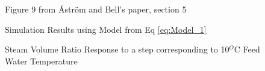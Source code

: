         \begin{figure}[ht]
            \begin{center}
                
                Figure 9 from \r{A}str\"{o}m and Bell's paper, section 5 \cite{Astrom}
                
                
                Simulation Results using Model from Eq \eqref{eq:Model_1}
                
                \caption{Steam Volume Ratio Response to a step corresponding to 10$^O$C Feed Water Temperature}
                \label{fig:Fig9E}
            \end{center}
        \end{figure}  %
